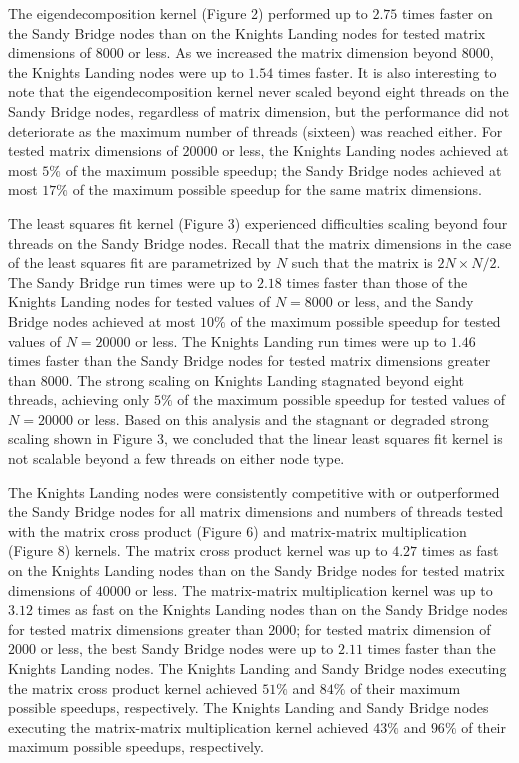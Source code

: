 The eigendecomposition kernel (Figure 2) performed up to $2.75$ times faster on
  the Sandy Bridge nodes than on the Knights Landing nodes for tested matrix
  dimensions of $8000$ or less.
As we increased the matrix dimension beyond $8000$, the Knights Landing nodes
  were up to $1.54$ times faster.
It is also interesting to note that the eigendecomposition kernel never scaled
  beyond eight threads on the Sandy Bridge nodes, regardless of matrix
  dimension, but the performance did not deteriorate as the maximum number of
  threads (sixteen) was reached either.
For tested matrix dimensions of $20000$ or less, the Knights Landing nodes
  achieved at most $5\%$ of the maximum possible speedup; the Sandy Bridge
  nodes achieved at most $17\%$ of the maximum possible speedup for the same
  matrix dimensions.

The least squares fit kernel (Figure 3) experienced difficulties scaling beyond
  four threads on the Sandy Bridge nodes.
Recall that the matrix dimensions in the case of the least squares fit are
  parametrized by $N$ such that the matrix is $2N \times N/2$.
The Sandy Bridge run times were up to $2.18$ times faster than those of the
  Knights Landing nodes for tested values of $N=8000$ or less, and the Sandy
  Bridge nodes achieved at most $10\%$ of the maximum possible speedup for
  tested values of $N=20000$ or less.
The Knights Landing run times were up to $1.46$ times faster than the Sandy
  Bridge nodes for tested matrix dimensions greater than $8000$.
The strong scaling on Knights Landing stagnated beyond eight threads, achieving
  only $5\%$ of the maximum possible speedup for tested values of $N=20000$ or
  less.
Based on this analysis and the stagnant or degraded strong scaling shown in
  Figure 3, we concluded that the linear least squares fit kernel is not
  scalable beyond a few threads on either node type.

The Knights Landing nodes were consistently competitive with or outperformed the
  Sandy Bridge nodes for all matrix dimensions and numbers of threads tested
  with the matrix cross product (Figure 6) and matrix-matrix multiplication
  (Figure 8) kernels.
The matrix cross product kernel was up to $4.27$ times as fast on the Knights
  Landing nodes than on the Sandy Bridge nodes for tested matrix dimensions of
  $40000$ or less.
The matrix-matrix multiplication kernel was up to $3.12$ times as fast on the
  Knights Landing nodes than on the Sandy Bridge nodes for tested matrix
  dimensions greater than $2000$; for tested matrix dimension of $2000$ or less,
  the best Sandy Bridge nodes were up to $2.11$ times faster than the Knights
  Landing nodes.
The Knights Landing and Sandy Bridge nodes executing the matrix cross product
  kernel achieved $51\%$ and $84\%$ of their maximum possible speedups,
  respectively.
The Knights Landing and Sandy Bridge nodes executing the matrix-matrix
  multiplication kernel achieved $43\%$ and $96\%$ of their maximum possible
  speedups, respectively.

